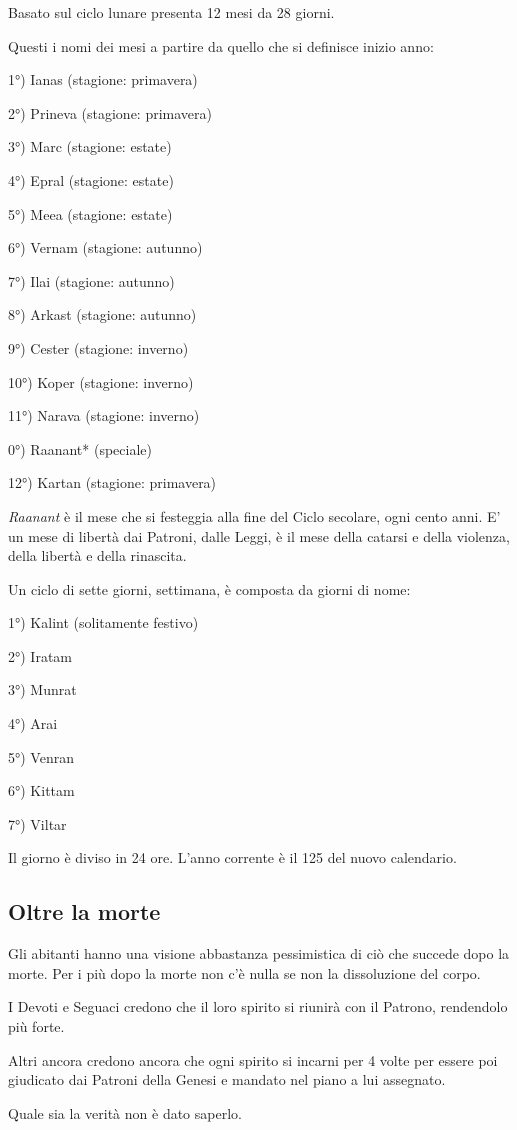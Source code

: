 \begin{multicols}{2}

\label{il-calendario}

Basato sul ciclo lunare presenta 12 mesi da 28 giorni.

Questi i nomi dei mesi a partire da quello che si definisce inizio anno:

1°) Ianas (stagione: primavera)

2°) Prineva (stagione: primavera)

3°) Marc (stagione: estate)

4°) Epral (stagione: estate)

5°) Meea (stagione: estate)

6°) Vernam (stagione: autunno)

7°) Ilai (stagione: autunno)

8°) Arkast (stagione: autunno)

9°) Cester (stagione: inverno)

10°) Koper (stagione: inverno)

11°) Narava (stagione: inverno)

0°) Raanant* (speciale)

12°) Kartan (stagione: primavera)

\medskip

\emph{Raanant} è il mese che si festeggia alla fine del Ciclo secolare, ogni cento anni. E' un mese di libertà dai Patroni, dalle Leggi, è il mese della catarsi e della violenza, della libertà e della rinascita.

\medskip

Un ciclo di sette giorni, settimana, è composta da giorni di nome:

\medskip

1°) Kalint (solitamente festivo)

2°) Iratam

3°) Munrat

4°) Arai

5°) Venran

6°) Kittam

7°) Viltar

\medskip

Il giorno è diviso in 24 ore. L'anno corrente è il 125 del nuovo calendario.

\subsection{Oltre la morte}

Gli abitanti hanno una visione abbastanza pessimistica di ciò che succede dopo la morte. Per i più dopo la morte non c'è nulla se non la dissoluzione del corpo.

I Devoti e Seguaci credono che il loro spirito si riunirà con il Patrono, rendendolo più forte.

Altri ancora credono ancora che ogni spirito si incarni per 4 volte per essere poi giudicato dai Patroni della Genesi e mandato nel piano a lui assegnato.

Quale sia la verità non è dato saperlo.

\end{multicols}

